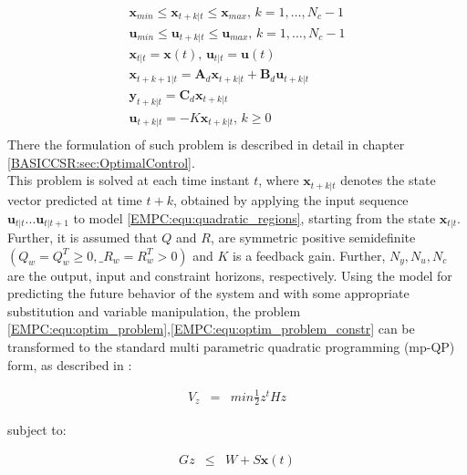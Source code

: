     \begin{equation}
        \begin{array}{l}
            \boldsymbol{x}_{min}\leq\boldsymbol{x}_{t+k|t}\leq\boldsymbol{x}_{max},\,k=1,\dots,N_c-1\\
            \boldsymbol{u}_{min}\leq\boldsymbol{u}_{t+k|t}\leq\boldsymbol{u}_{max},\,k=1,\dots,N_c-1\\
            \boldsymbol{x}_{t|t}=\boldsymbol{x}(t),\,\boldsymbol{u}_{t|t}=\boldsymbol{u}(t)\\
            \boldsymbol{x}_{t+k+1|t}=\boldsymbol{A}_d\boldsymbol{x}_{t+k|t}+\boldsymbol{B}_d\boldsymbol{u}_{t+k|t}\\
            \boldsymbol{y}_{t+k|t}=\boldsymbol{C}_d\boldsymbol{x}_{t+k|t}\\
            \boldsymbol{u}_{t+k|t}=-K\boldsymbol{x}_{t+k|t},\,k\geq0\\
        \end{array}
        \label{EMPC:equ:optim_problem_constr}
    \end{equation}
There the formulation of such problem is described in detail in chapter \ref{BASICCSR:sec:OptimalControl}.\\
    This problem is solved at each time instant $t$, where $\textbf{x}_{t+k\vert t}$ denotes the state vector predicted at time $t+k$, obtained by applying the input sequence $\textbf{u}_{t|t}...\textbf{u}_{t|t+1}$ to model \ref{EMPC:equ:quadratic_regions}, starting from the state $\textbf{x}_{t|t}$. Further, it is assumed that $Q$ and $R$, are symmetric positive semidefinite $(Q_w=Q_w^T\geq0,\_R_w=R_w^T>0)$ and $K$ is a feedback gain. Further, $N_y,N_u,N_c$ are the output, input and constraint horizons, respectively.
    Using the model for predicting the future behavior of the system and with some appropriate substitution and variable manipulation, the problem \ref{EMPC:equ:optim_problem},\ref{EMPC:equ:optim_problem_constr} can be transformed to the standard multi parametric quadratic programming (mp-QP) form, as described in \cite{rivera2013predictive}:

    \begin{equation}
        \begin{array}{rcl}
            V_z&=&min\frac{1}{2}z^tHz
        \end{array}
        \label{EMPC:equ:quadratic_program}
    \end{equation}

    subject to:

    \begin{equation}
        \begin{array}{rcl}
            Gz&\leq&W+S\boldsymbol{x}(t)
        \end{array}
        \label{EMPC:equ:quadratic_inequality}
    \end{equation}

